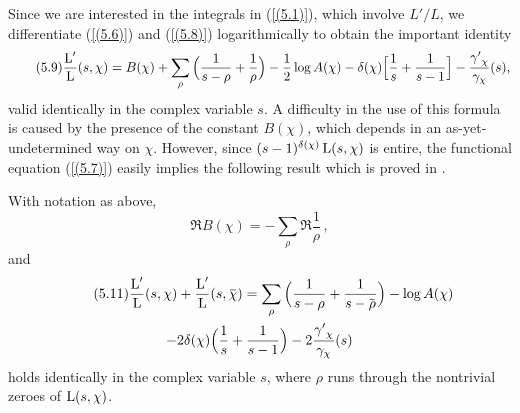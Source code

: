 \documentclass[./main]{subfiles}
\begin{document}
Since we are interested in the integrals in (\ref{(5.1)}), which involve $L'/L$, we differentiate (\ref{(5.6)}) and (\ref{(5.8)}) logarithmically to obtain the important identity
\[\label{(5.9)}\tag{5.9}\frac{\operatorname{L}'}{\operatorname{L}}(s,\chi) = B(\chi) + \sum_{\rho}{\Big(\frac{1}{s-\rho}+\frac{1}{\rho}\Big)}-\frac{1}{2}\log{A(\chi)} - \delta(\chi)\Big[\frac{1}{s}+\frac{1}{s-1}\Big] - \frac{{\gamma'}_\chi}{\gamma_\chi}(s),\]
valid identically in the complex variable $s$. A difficulty in the use of this formula is caused by the presence of the constant $B(\chi)$, which depends in an as-yet-undetermined way on $\chi$. However, since $(s-1)^{\delta(\chi)}\operatorname{L}(s,\chi)$ is entire, the functional equation (\ref{(5.7)}) easily implies the following result which is proved in \cite{11-odlyzko1977}.
\begin{lemma}\label{5.1}
With notation as above,
\[\tag{5.10}\label{(5.10)}\Re{B(\chi)} = -\sum_{\rho}\Re{\frac{1}{\rho}}\,,\]
and
\begin{multline}\tag{5.11}\label{(5.11)}\frac{\L'}{\L}(s,\chi) + \frac{\L'}{\L}(s,\xoverline{\chi}) = \sum_{\rho}{\Big(\frac{1}{s-\rho}+\frac{1}{s-\xoverline{\rho}}\Big)} - \log{A(\chi)} \\ -2\delta(\chi)\Big(\frac{1}{s}+\frac{1}{s-1}\Big) - 2\frac{{\gamma'}_\chi}{\gamma_\chi}(s)
\end{multline}
holds identically in the complex variable $s$, where $\rho$ runs through the nontrivial zeroes of $\operatorname{L}(s,\chi)$.
\end{lemma}
\end{document}
